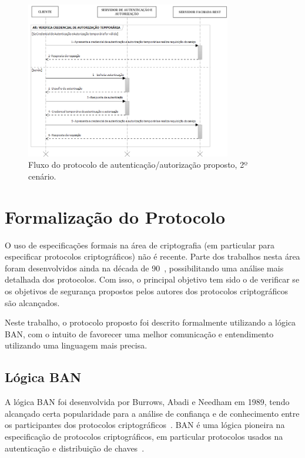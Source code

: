 \begin{figure}[!htb]
    \centering
     \includegraphics[width=0.8\textwidth]{cenario2_autenticacao.png}
     \caption{Fluxo do protocolo de autenticação/autorização proposto, 2º cenário.}
     \label{fig:cenario2}
\end{figure}


\section{Formalização do Protocolo}

O uso de especificações formais na área de criptografia (em particular para especificar protocolos criptográficos)
não é recente. Parte dos trabalhos nesta área foram desenvolvidos ainda na década de 90~\cite{Meadows95}, possibilitando uma análise mais detalhada dos protocolos. Com isso, o principal objetivo tem sido o de verificar se os objetivos de segurança propostos pelos autores dos protocolos criptográficos são alcançados.

Neste trabalho, o protocolo proposto foi descrito formalmente utilizando a lógica BAN, com o intuito de favorecer uma melhor comunicação e entendimento utilizando uma linguagem mais precisa. %

\subsection{Lógica BAN}

A lógica BAN foi desenvolvida por Burrows, Abadi e Needham em 1989, tendo alcançado certa popularidade para a análise de confiança e de conhecimento entre os participantes dos protocolos criptográficos~\cite{Burrows1990}. BAN é uma lógica pioneira na especificação de protocolos criptográficos, em particular protocolos usados na autenticação e
distribuição de chaves~\cite{Burrows1990}.

